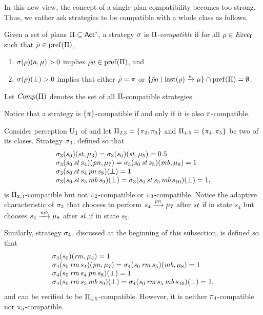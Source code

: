 In this new view, the concept of a single plan compatibility becomes
too strong.  Thus, we rather ask strategies to be compatible with a
whole class as follows.

\begin{definition}\label{def:plans:compat}
  Given a set of plans $\Pi\subseteq{\rm \sf Act}^*$, a strategy $\sigma$ is
  \emph{$\Pi$-compatible} if for all $\rho\in\mathit{Exec}_{\mathsf{f}}$ such that
  $\bar{\rho}\in\mathrm{pref}(\Pi)$,
  \begin{enumerate}
  \item\label{def:plans:compat:i}%
    $\sigma(\rho)(a,\mu)>0$ implies $\bar{\rho}a\in\mathrm{pref}(\Pi)$, and
  \item\label{def:plans:compat:ii}%
    $\sigma(\rho)(\bot)>0$ implies that either
    $\bar{\rho}=\pi$ or
    $\{\bar{\rho}a\mid{\mathrm{last}(\rho)\xrightarrow{a}\mu}\}\cap\mathrm{pref}(\Pi) = \emptyset$. 
  \end{enumerate}
  Let $\mathit{Comp}(\Pi)$ denotes the set of all $\Pi$-compatible
  strategies.
\end{definition}
%
Notice that a strategy is $\{\pi\}$-compatible if and only if it is
also $\pi$-compatible.

\begin{example}\label{ex:running:strat-comp-adapt}
  Consider perception $\operatorname{U}_1$ of
   and let $\Pi_{2,3}=\{\pi_2,\pi_3\}$
  and $\Pi_{4,5}=\{\pi_4,\pi_5\}$ be two of its clases.
  Strategy $\sigma_3$, defined so that
  \[
  \begin{array}{l}
    \sigma_3(s_0)(\mathit{st},\mu_3)=\sigma_3(s_0)(\mathit{st},\mu_5)=0.5\\
    \sigma_3(s_0\,\mathit{st}\,s_4)(\mathit{pn},\mu_7)=\sigma_3(s_0\,\mathit{st}\,s_5)(\mathit{mb},\mu_8)=1\\
    \sigma_3(s_0\,\mathit{st}\,s_4\,\mathit{pn}\,s_8)(\bot)=1\\
    \sigma_3(s_0\,\mathit{st}\,s_5\,\mathit{mb}\,s_9)(\bot)=
    \sigma_3(s_0\,\mathit{st}\,s_5\,\mathit{mb}\,s_{10})(\bot)=1,
  \end{array}
  \]
  is $\Pi_{2,3}$-compatible but not
  $\pi_2$-compatible or $\pi_3$-compatible.
  Notice the adaptive characteristic of $\sigma_3$ that chooses to
  perform $s_4\xrightarrow{\mathit{pn}}\mu_7$ after $\mathit{st}$ if in state $s_4$
  but chooses $s_4\xrightarrow{\mathit{mb}}\mu_8$ after $\mathit{st}$ if in
  state $s_5$.

  Similarly, strategy $\sigma_4$, discussed at the beginning of this
  subsection, is defined so that
  \[
  \begin{array}{l}
    \sigma_4(s_0)(\mathit{rm},\mu_4)=1\\
    \sigma_4(s_0\,\mathit{rm}\,s_4)(\mathit{pn},\mu_7)=\sigma_4(s_0\,\mathit{rm}\,s_5)(\mathit{mb},\mu_8)=1\\
    \sigma_4(s_0\,\mathit{rm}\,s_4\,\mathit{pn}\,s_8)(\bot)=1\\
    \sigma_4(s_0\,\mathit{rm}\,s_5\,\mathit{mb}\,s_9)(\bot)=
    \sigma_4(s_0\,\mathit{rm}\,s_5\,\mathit{mb}\,s_{10})(\bot)=1,
  \end{array}
  \]
  and can be verified to be $\Pi_{4,5}$-compatible. However, it is
  neither $\pi_4$-compatible nor $\pi_5$-compatible.
\end{example}

